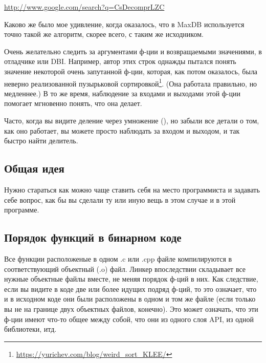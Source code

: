 \url{http://www.google.com/search?q=CsDecomprLZC}

Каково же было мое удивление, когда оказалось, что в MaxDB используется точно такой же алгоритм, 
скорее всего, с таким же исходником.




Очень желательно следить за аргументами ф-ции и возвращаемыми значениями, в отладчике или \ac{DBI}.
Например, автор этих строк однажды пытался понять значение некоторой очень запутанной ф-ции, которая, как потом оказалось,
была неверно реализованной пузырьковой сортировкой\footnote{\url{https://yurichev.com/blog/weird_sort_KLEE/}}.
(Она работала правильно, но медленнее.)
В то же время, наблюдение за входами и выходами этой ф-ции помогает мгновенно понять, что она делает.

Часто, когда вы видите деление через умножение (),
но забыли все детали о том, как оно работает, вы можете просто наблюдать за входом и выходом, и так быстро найти делитель.














\subsection{Общая идея}

Нужно стараться как можно чаще ставить себя на место программиста и задавать себе вопрос, 
как бы вы сделали ту или иную вещь в этом случае и в этой программе.

\subsection{Порядок функций в бинарном коде}

Все функции расположеные в одном .c или .cpp файле компилируются в соответствующий объектный (.o) файл.
Линкер впоследствии складывает все нужные объектные файлы вместе, не меняя порядок ф-ций в них.
Как следствие, если вы видите в коде две или более идущих подряд ф-ций, то это означает, что и в исходном коде они 
были расположены в одном и том же файле (если только вы не на границе двух объектных файлов, конечно).
Это может означать, что эти ф-ции имеют что-то общее между собой, что они из одного слоя \ac{API}, из одной библиотеки, итд.

